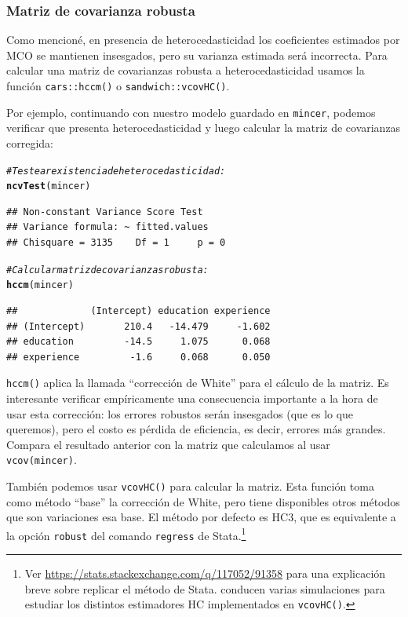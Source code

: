 \documentclass{article}\usepackage[]{graphicx}\usepackage[]{color}
\makeatletter
\newcommand{\hlcom}[1]{\textcolor[rgb]{0.678,0.584,0.686}{\textit{#1}}}%
\newcommand{\hlstd}[1]{\textcolor[rgb]{0.345,0.345,0.345}{#1}}%
\newcommand{\hlkwd}[1]{\textcolor[rgb]{0.737,0.353,0.396}{\textbf{#1}}}%
\newenvironment{kframe}{%
 \def\at@end@of@kframe{}%
 \ifinner\ifhmode%
  \def\at@end@of@kframe{\end{minipage}}%
  \begin{minipage}{\columnwidth}%
 \fi\fi%
 \def\FrameCommand##1{\hskip\@totalleftmargin \hskip-\fboxsep
 \colorbox{shadecolor}{##1}\hskip-\fboxsep
     \hskip-\linewidth \hskip-\@totalleftmargin \hskip\columnwidth}%
 \MakeFramed {\advance\hsize-\width
   \@totalleftmargin\z@ \linewidth\hsize
   \@setminipage}}%
 {\par\unskip\endMakeFramed%
 \at@end@of@kframe}
\newenvironment{knitrout}{}{} %
\makeatother
\begin{document}
\subsubsection{Matriz de covarianza robusta}
\label{sec:matriz_cov_robusta}

Como mencioné, en presencia de heterocedasticidad los coeficientes estimados por MCO se mantienen insesgados, pero su varianza estimada será incorrecta. Para calcular una matriz de covarianzas robusta a heterocedasticidad usamos la función \verb|cars::hccm()| o \verb|sandwich::vcovHC()|.

Por ejemplo, continuando con nuestro modelo guardado en \verb|mincer|, podemos verificar que presenta heterocedasticidad y luego calcular la matriz de covarianzas corregida:

\begin{knitrout}
\color{fgcolor}\begin{kframe}
\begin{alltt}
\hlcom{# Testear existencia de heterocedasticidad:}
\hlkwd{ncvTest}\hlstd{(mincer)}
\end{alltt}
\begin{verbatim}
## Non-constant Variance Score Test 
## Variance formula: ~ fitted.values 
## Chisquare = 3135    Df = 1     p = 0
\end{verbatim}
\begin{alltt}
\hlcom{# Calcular matriz de covarianzas robusta:}
\hlkwd{hccm}\hlstd{(mincer)}
\end{alltt}
\begin{verbatim}
##             (Intercept) education experience
## (Intercept)       210.4   -14.479     -1.602
## education         -14.5     1.075      0.068
## experience         -1.6     0.068      0.050
\end{verbatim}
\end{kframe}
\end{knitrout}

\verb|hccm()| aplica la llamada ``corrección de White'' para el cálculo de la matriz. 
Es interesante verificar empíricamente una consecuencia importante a la hora de usar esta corrección: los errores robustos serán insesgados (que es lo que queremos), pero el costo es pérdida de eficiencia, es decir, errores más grandes. Compara el resultado anterior con la matriz que calculamos al usar \verb|vcov(mincer)|.

También podemos usar \verb|vcovHC()| para calcular la matriz. Esta función toma como método ``base'' la corrección de White, pero tiene disponibles otros métodos que son variaciones esa base. El método por defecto es HC3, que es equivalente a la opción \verb|robust| del comando \verb|regress| de Stata.\footnote{Ver \url{https://stats.stackexchange.com/q/117052/91358} para una explicación breve sobre replicar el método de Stata. \textcite{long_using_2000} conducen varias simulaciones para estudiar los distintos estimadores HC implementados en \texttt{vcovHC()}.}
\end{document}
